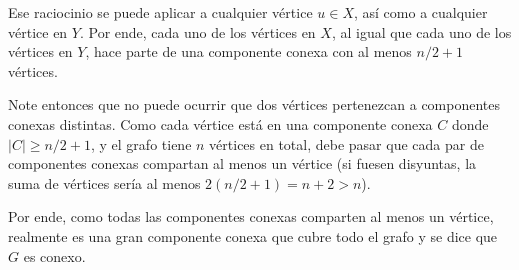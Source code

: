 Ese raciocinio se puede aplicar a cualquier vértice \(u \in X\), así como a cualquier vértice en \(Y\). Por ende, cada uno de los vértices en \(X\), al igual que cada uno de los vértices en \(Y\), hace parte de una componente conexa con al menos \(n/2+1\) vértices.

Note entonces que no puede ocurrir que dos vértices pertenezcan a componentes conexas distintas. Como cada vértice está en una componente conexa \(C\) donde \(|C| \geq n/2+1\), y el grafo tiene \(n\) vértices en total, debe pasar que cada par de componentes conexas compartan al menos un vértice (si fuesen disyuntas, la suma de vértices sería al menos \(2(n/2+1) = n+2 > n\)).

Por ende, como todas las componentes conexas comparten al menos un vértice, realmente es una gran componente conexa que cubre todo el grafo y se dice que \(G\) es conexo.



